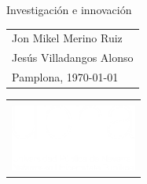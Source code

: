 \begin{tcolorbox}[
    colback=black, coltext=white,
    height=8.25cm, size=normal, left=25pt, top=50pt, right=25pt,
    boxrule=0pt, arc=0pt, outer arc=0pt
]
\begin{center}{}
\LARGE
Investigación e innovación
\end{center}

\vspace{0.8cm}

\large
\noindent\begin{tabular}[t]{@{}l}
\vspace{0.2cm}
Jon Mikel Merino Ruiz \\
\vspace{0.2cm}
Jesús Villadangos Alonso \\
\vspace{0.2cm}
Pamplona, \today
\end{tabular}
\hfill
\begin{tabular}[t]{r@{}}
\\
\\
\includegraphics[width=4.15cm]{Imagenes/portada/UPNA_Logo.png}
\end{tabular}

\end{tcolorbox}

\thispagestyle{empty} %

\clearpage
\pagecolor{white}

\newpage\leavevmode\thispagestyle{empty}\newpage

\setcounter{page}{1} %